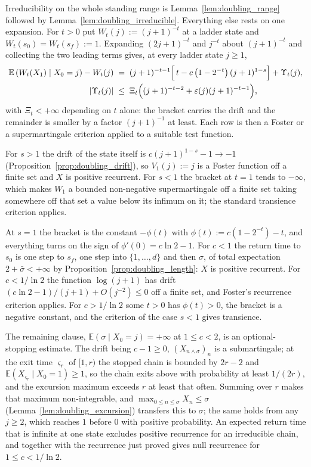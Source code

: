 Irreducibility on the whole standing range is Lemma~\ref{lem:doubling_range} followed by
Lemma~\ref{lem:doubling_irreducible}. Everything else rests on one expansion. For $t>0$ put
$W_t(j):=(j+1)^{-t}$ at a ladder state and $W_t(s_0)=W_t(s_f):=1$. Expanding $(2j+1)^{-t}$ and
$j^{-t}$ about $(j+1)^{-t}$ and collecting the two leading terms gives, at every ladder state
$j\geq1$,
\begin{equation}\label{eq:doubling_Wdrift}
\begin{aligned}
    \mathbb E\left(W_t(X_1)\mid X_0=j\right)-W_t(j)
    &\;=\;(j+1)^{-t-1}\Bigl[\,t-c\left(1-2^{-t}\right)(j+1)^{1-s}\Bigr]+\Upsilon_t(j),\\
    |\Upsilon_t(j)|&\;\leq\;\Xi_t\Bigl((j+1)^{-t-2}+\varepsilon(j)(j+1)^{-t-1}\Bigr),
\end{aligned}
\end{equation}
with $\Xi_t<+\infty$ depending on $t$ alone: the bracket carries the drift and the remainder is
smaller by a factor $(j+1)^{-1}$ at least. Each row is then a Foster or a supermartingale
criterion applied to a suitable test function.

For $s>1$ the drift of the state itself is $c(j+1)^{1-s}-1\rightarrow-1$
(Proposition~\ref{prop:doubling_drift}), so $V_1(j):=j$ is a Foster function off a finite set
and $X$ is positive recurrent. For $s<1$ the bracket at $t=1$ tends to $-\infty$, which makes
$W_1$ a bounded non-negative supermartingale off a finite set taking somewhere off that set a
value below its infimum on it; the standard transience criterion applies.

At $s=1$ the bracket is the constant $-\phi(t)$ with $\phi(t):=c\left(1-2^{-t}\right)-t$, and
everything turns on the sign of $\phi'(0)=c\ln2-1$. For $c<1$ the return time to $s_0$ is one
step to $s_f$, one step into $\{1,\dots,d\}$ and then $\sigma$, of total expectation
$2+\bar\sigma<+\infty$ by Proposition~\ref{prop:doubling_length}: $X$ is positive recurrent.
For $c<1/\ln2$ the function $\log(j+1)$ has drift $(c\ln2-1)/(j+1)+O(j^{-2})\leq0$ off a finite
set, and Foster's recurrence criterion applies. For $c>1/\ln2$ some $t>0$ has $\phi(t)>0$, the
bracket is a negative constant, and the criterion of the case $s<1$ gives transience.

The remaining clause, $\mathbb E(\sigma\mid X_0=j)=+\infty$ at $1\leq c<2$, is an
optional-stopping estimate. The drift being $c-1\geq0$, $(X_{n\wedge\sigma})_n$ is a
submartingale; at the exit time $\varsigma_r$ of $[1,r)$ the stopped chain is bounded by
$2r-2$ and $\mathbb E(X_{\varsigma_r}\mid X_0=1)\geq1$, so the chain exits above with
probability at least $1/(2r)$, and the excursion maximum exceeds $r$ at least that often.
Summing over $r$ makes that maximum non-integrable, and
$\max_{0\leq n\leq\sigma}X_n\leq\sigma$ (Lemma~\ref{lem:doubling_excursion}) transfers this to
$\sigma$; the same holds from any $j\geq2$, which reaches $1$ before $0$ with positive
probability. An expected return time that is infinite at one state excludes positive
recurrence for an irreducible chain, and together with the recurrence just proved gives null
recurrence for $1\leq c<1/\ln2$.
